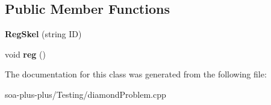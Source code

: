 \subsection*{Public Member Functions}
\begin{DoxyCompactItemize}
\item 
\hypertarget{class_reg_skel_adb89a93f2a775c7f1c80025f3f0115a1}{
{\bfseries RegSkel} (string ID)}
\label{class_reg_skel_adb89a93f2a775c7f1c80025f3f0115a1}

\item 
\hypertarget{class_reg_skel_a77a6151d3609eb574a0225baa5067320}{
void {\bfseries reg} ()}
\label{class_reg_skel_a77a6151d3609eb574a0225baa5067320}

\end{DoxyCompactItemize}


The documentation for this class was generated from the following file:\begin{DoxyCompactItemize}
\item 
soa-\/plus-\/plus/Testing/diamondProblem.cpp\end{DoxyCompactItemize}
